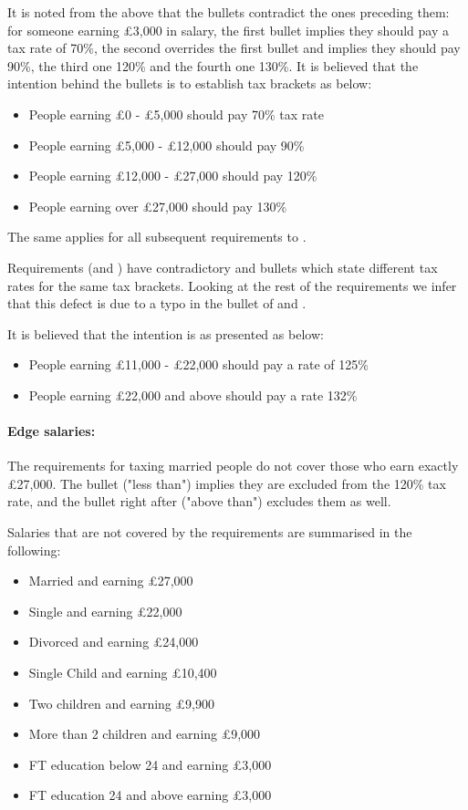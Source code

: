 It is noted from the above that the bullets contradict the ones preceding them: for someone earning £3,000 in salary, the first bullet implies they should pay a tax rate of 70\%, the second overrides the first bullet and implies they should pay 90\%, the third one 120\% and the fourth one 130\%. It is believed that the intention behind the bullets is to establish tax brackets as below: 
\begin{itemize}
	\item People earning £0 - £5,000 should pay 70\% tax rate 
	\item People earning £5,000 - £12,000 should pay 90\%
	\item People earning £12,000 - £27,000 should pay 120\%
	\item People earning over £27,000 should pay 130\%
\end{itemize}
The same applies for all subsequent requirements \REightSix \space to \REightTwelve. 

Requirements (\REightSix \space and \REightSeven) have contradictory  and  bullets which state different tax rates for the same tax brackets. Looking at the rest of the requirements we infer that this defect is due to a typo in the  bullet of \REightSix \space and \REightSeven. 

It is believed that the intention is as presented as below: 
\begin{itemize}
	\item People earning £11,000 - £22,000 should pay a rate of 125\%
	\item People earning £22,000 and above should pay a rate 132\%
\end{itemize}

\paragraph{Edge salaries:}
The requirements for taxing married people do not cover those who earn exactly £27,000. The  bullet ("less than") implies they are excluded from the 120\% tax rate, and the bullet right after ("above than") excludes them as well. 
\par
Salaries that are not covered by the requirements are summarised in the following:
\begin{itemize}
	\item Married and earning £27,000
	\item Single and earning £22,000
	\item Divorced and earning £24,000
	\item Single Child and earning £10,400
	\item Two children and earning £9,900
	\item More than 2 children and earning £9,000
	\item FT education below 24 and earning £3,000
	\item FT education 24 and above earning £3,000
\end{itemize}

